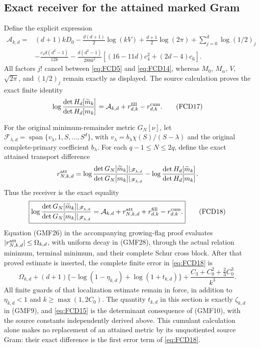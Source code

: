 \documentclass[11pt]{article}
\begin{document}
\subsection{Exact receiver for the attained marked Gram}

Define the explicit expression
\begin{equation}
 \begin{split}
 \mathcal A_{k,d}={}&
 (d+1)kD_0-\frac{d(d+1)}2\log(kV)
 +\frac{d+1}2\log(2\pi)+\sum_{j=0}^d\log(1/2)_j\\
 &-\frac{c_4d(d^2-1)}{12k}
 -\frac{d(d^2-1)}{288k^2}
          [(16-11d)c_4^2+(2d-4)c_6].
 \end{split}
 \tag{FCD16}\label{eq:FCD16}
\end{equation}
All factors \(j!\) cancel between \eqref{eq:FCD5} and
\eqref{eq:FCD14}, whereas \(M_0\), \(M_\alpha\), \(V\),
\(\sqrt{2\pi}\), and \((1/2)_j\) remain exactly as displayed.
The source calculation proves the exact finite identity
\begin{equation}
 \log\frac{\det H_d[\widetilde m_k]}{\det H_d[m_k]}
       =\mathcal A_{k,d}+r_{d,k}^{\rm fill}-r_{d,k}^{\rm cum}.
 \tag{FCD17}\label{eq:FCD17}
\end{equation}

For the original minimum-remainder metric \(G_N[\nu]\), let
\(\mathscr F_{\lambda,d}
 =\operatorname{span}\{v_\lambda,1,S,\ldots,S^d\}\), with
\(v_\lambda=b_\lambda\chi(S)/(S-\lambda)\) and the original
complete-primary coefficient \(b_\lambda\).
For each \(q-1\le N\le2q\), define the exact attained transport difference
\[
 r_{N,k,d}^{\rm att}
  =\log\frac{\det G_N[\widetilde m_k]|_{\mathscr F_{\lambda,d}}}
                  {\det G_N[m_k]|_{\mathscr F_{\lambda,d}}}
    -\log\frac{\det H_d[\widetilde m_k]}{\det H_d[m_k]} .
\]
Thus the receiver is the exact equality
\begin{equation}
 \boxed{\displaystyle
 \log\frac{\det G_N[\widetilde m_k]|_{\mathscr F_{\lambda,d}}}
                  {\det G_N[m_k]|_{\mathscr F_{\lambda,d}}}
  =\mathcal A_{k,d}+r_{N,k,d}^{\rm att}
                          +r_{d,k}^{\rm fill}-r_{d,k}^{\rm cum}.}
 \tag{FCD18}\label{eq:FCD18}
\end{equation}
Equation (GMF26) in the accompanying growing-flag proof evaluates
\(|r_{N,k,d}^{\rm att}|\le\Omega_{k,d}\), with uniform decay in (GMF28),
through the actual relation
minimum, terminal minimum, and their complete Schur cross block.
After that proved estimate is inserted, the complete finite error in
\eqref{eq:FCD18} is
\begin{equation}
 \Omega_{k,d}
 +(d+1)\{-\log(1-\eta_{k,d})+\log(1+t_{k,d})\}
 +\frac{C_3+C_0^2+\tfrac23C_0^3}{k^3}.
 \tag{FCD19}\label{eq:FCD19}
\end{equation}
All finite guards of that localization estimate remain in force, in
addition to \(\eta_{k,d}<1\) and \(k\ge\max(1,2C_0)\).
The quantity \(t_{k,d}\) in this section is exactly \(\zeta_{k,d}\)
in (GMF9), and \eqref{eq:FCD15} is the determinant consequence
of (GMF10), with the source constants independently derived above.
This cumulant calculation alone makes no replacement of an attained
metric by its unquotiented source Gram: their exact difference is
the first error term of \eqref{eq:FCD18}.
\end{document}
